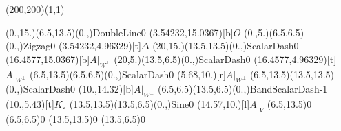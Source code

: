 \unitlength=1bp%

\begin{feynartspicture}(200,200)(1,1)

\FADiagram{}
\FAProp(0.,15.)(6.5,13.5)(0.,){DoubleLine}{0}
\FALabel(3.54232,15.0367)[b]{$O$}
\FAProp(0.,5.)(6.5,6.5)(0.,){Zigzag}{0}
\FALabel(3.54232,4.96329)[t]{$\Delta$}
\FAProp(20,15.)(13.5,13.5)(0.,){ScalarDash}{0}
\FALabel(16.4577,15.0367)[b]{$A|_{W^\perp}$}
\FAProp(20,5.)(13.5,6.5)(0.,){ScalarDash}{0}
\FALabel(16.4577,4.96329)[t]{$A|_{W^\perp}$}
\FAProp(6.5,13.5)(6.5,6.5)(0.,){ScalarDash}{0}
\FALabel(5.68,10.)[r]{$A|_{W^\perp}$}
\FAProp(6.5,13.5)(13.5,13.5)(0.,){ScalarDash}{0}
\FALabel(10.,14.32)[b]{$A|_{W^\perp}$}
\FAProp(6.5,6.5)(13.5,6.5)(0.,){BandScalarDash}{-1}
\FALabel(10.,5.43)[t]{$K_\varepsilon$}
\FAProp(13.5,13.5)(13.5,6.5)(0.,){Sine}{0}
\FALabel(14.57,10.)[l]{$A|_V$}
\FAVert(6.5,13.5){0}
\FAVert(6.5,6.5){0}
\FAVert(13.5,13.5){0}
\FAVert(13.5,6.5){0}
\end{feynartspicture}


